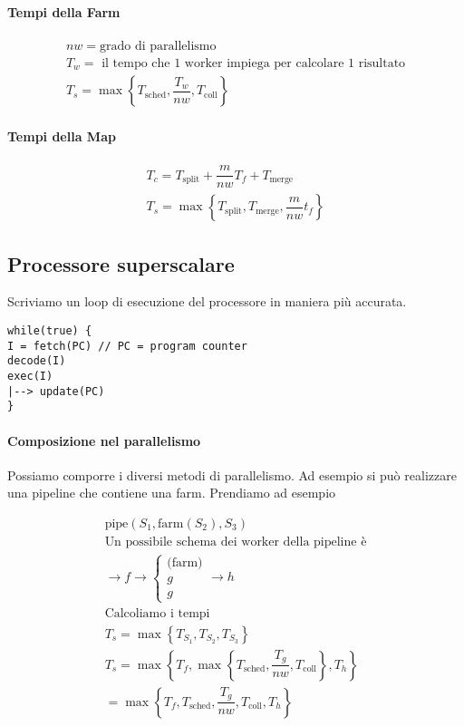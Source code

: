 \paragraph{Tempi della Farm}
\[ \begin{aligned}
nw = \text{grado di parallelismo}\\
T_w = \text{ il tempo che 1 worker impiega per calcolare 1 risultato} \\
T_s = \max\left\{T_{\text{sched}}, \dfrac{T_w}{nw}, T_{\text{coll}}\right\}
\end{aligned} \]

\paragraph{Tempi della Map}
\[ \begin{aligned}
T_c = T_\text{split} + \dfrac{m}{nw} T_f + T_\text{merge} \\
T_s = \max\left\{T_\text{split}, T_\text{merge}, \dfrac{m}{nw}t_f\right\}
\end{aligned} \]

\subsection{Processore superscalare}

Scriviamo un loop di esecuzione del processore in maniera più accurata.

\begin{lstlisting}[frame=single]
while(true) {
I = fetch(PC) // PC = program counter
decode(I)
exec(I)
|--> update(PC)
}
\end{lstlisting}



\paragraph{Composizione nel parallelismo}

Possiamo comporre i diversi metodi di parallelismo. Ad esempio si può realizzare una pipeline che contiene una farm. Prendiamo ad esempio

\[ \begin{aligned}
\text{pipe}(S_1, \text{farm}(S_2), S_3) \\
\text{Un possibile schema dei worker della pipeline è} \\
\to f \to \begin{cases}
\text{(farm)} \\
g \\ g
\end{cases} \to h \\
\text{Calcoliamo i tempi} \\
T_s = \max\left\{T_{S_1}, T_{S_2}, T_{S_3}\right\} \\
T_s = \max\left\{T_f, \max\left\{T_\text{sched}, \dfrac{T_g}{nw}, T_\text{coll}\right\}, T_h \right\} \\
= \max\left\{T_f, T_\text{sched}, \dfrac{T_g}{nw}, T_\text{coll}, T_h \right\}
\end{aligned} \]

